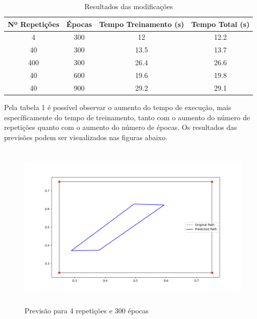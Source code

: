 \documentclass[12 pt]{article}
\begin{document}
\begin{enumerate}
    \begin{table}[H]
        \centering
        \caption{Resultados das modificações}
        \begin{tabular}{|c|c|c|c|}
            \hline
            Nº Repetições & Épocas & Tempo Treinamento (s) & Tempo Total (s) \\
            \hline
            4 & 300 & 12 & 12.2 \\
            \hline
            40 & 300 & 13.5 & 13.7 \\
            \hline
            400 & 300 & 26.4 & 26.6 \\
            \hline
            40 & 600 & 19.6 & 19.8 \\
            \hline
            40 & 900 & 29.2 & 29.1 \\
            \hline
        \end{tabular}
    \end{table}

    Pela tabela 1 é possível observar o aumento do tempo de execução, mais específicamente do tempo de treinamento, tanto com o aumento do número de repetições quanto com o aumento do número de épocas. Os resultados das previsões podem ser visualizados nas figuras abaixo.
    

    \begin{figure}[H]
        \caption{Previsão para 4 repetições e 300 épocas}
           \centering
           \includegraphics[height=8cm]{fig/Item_4_4_300.png}
    \end{figure}


\end{enumerate}
\end{document}
